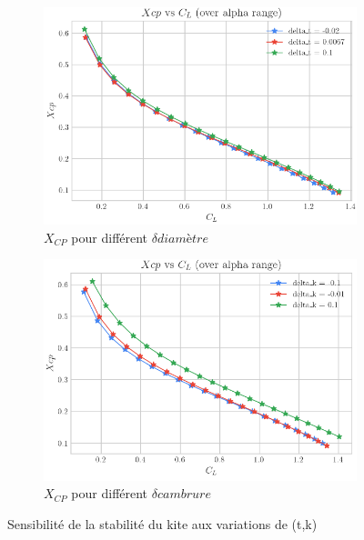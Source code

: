 \begin{figure}[H]
    \centering
    \begin{subfigure}[b]{0.45\textwidth}
        \centering
        \includegraphics[width=\linewidth]{Pics/04 -Etudes complémentaires/stabilité diam.png}
        \caption{$X_{CP}$ pour différent $\delta diamètre$}
        \label{fig:stabilité diamètre}
    \end{subfigure}
    \hfill
    \begin{subfigure}[b]{0.45\textwidth}
        \centering
        \includegraphics[width=\linewidth]{Pics/04 -Etudes complémentaires/stabilité dep.png}
        \caption{$X_{CP}$ pour différent $\delta cambrure$}
        \label{fig:stabilité cambrure}
    \end{subfigure}
    \caption{Sensibilité de la stabilité du kite aux variations de (t,k)}
    \label{fig:stabilité}
\end{figure}

